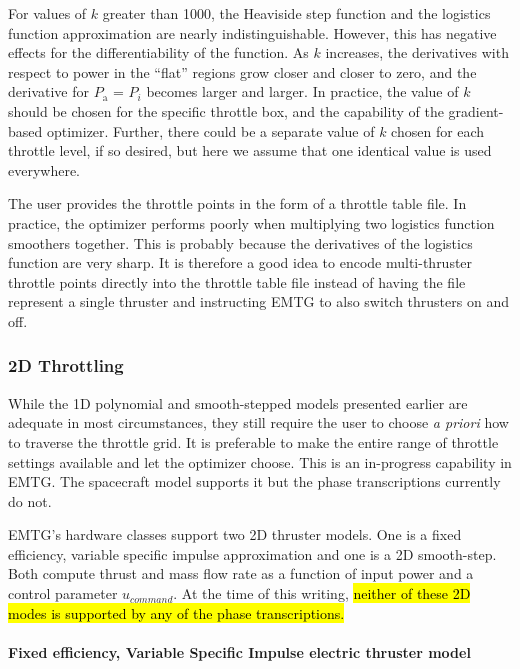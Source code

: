 For values of $k$ greater than 1000, the Heaviside step function and the logistics function approximation are nearly indistinguishable. However, this has negative effects for the differentiability of the function. As $k$ increases, the derivatives with respect to power in the ``flat'' regions grow closer and closer to zero, and the derivative for $P_\textrm{a}$ = $P_i$ becomes larger and larger. In practice, the value of $k$ should be chosen for the specific throttle box, and the capability of the gradient-based optimizer. Further, there could be a separate value of $k$ chosen for each throttle level, if so desired, but here we assume that one identical value is used everywhere.

The user provides the throttle points in the form of a throttle table file. In practice, the optimizer performs poorly when multiplying two logistics function smoothers together. This is probably because the derivatives of the logistics function are very sharp. It is therefore a good idea to encode multi-thruster throttle points directly into the throttle table file instead of having the file represent a single thruster and instructing \ac{EMTG} to also switch thrusters on and off.

\subsubsection{2D Throttling}
\label{subsubsec:2D-throttling}

While the 1D polynomial and smooth-stepped models presented earlier are adequate in most circumstances, they still require the user to choose \textit{a priori} how to traverse the throttle grid. It is preferable to make the entire range of throttle settings available and let the optimizer choose. This is an in-progress capability in \ac{EMTG}. The spacecraft model supports it but the phase transcriptions currently do not.

\ac{EMTG}'s hardware classes support two 2D thruster models. One is a fixed efficiency, variable specific impulse approximation and one is a 2D smooth-step. Both compute thrust and mass flow rate as a function of input power and a control parameter $u_{command}$. At the time of this writing, \hl{neither of these 2D modes is supported by any of the phase transcriptions.}

\noindent\paragraph{Fixed efficiency, Variable Specific Impulse electric thruster model}
\label{subsubsubsec:fixed-efficiency-VSI}

